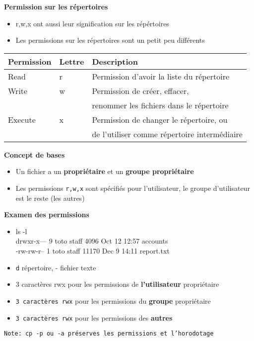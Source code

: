 \documentclass[french]{beamer}
\begin{document}
\begin{frame}
\textbf{Permission sur les répertoires}
    \begin{itemize}
    \item r,w,x ont aussi leur signification sur les répértoires
    \item Les permissions sur les répertoires sont un petit peu différents
\end{itemize}
\begin{tabular}{|l|l|l|}
    \hline
    \textbf{Permission} & \textbf{Lettre} & \textbf{Description} \\
    \hline
    Read & r & Permission d'avoir la liste du répertoire \\
    Write & w & Permission de créer, effacer,\\ 
    & & renommer les fichiers dans le répertoire \\
    Execute & x & Permission de changer le répertoire, ou  \\
    & & de l'utiliser comme répertoire intermédiaire \\
    \hline
\end{tabular}
\end{frame}

\begin{frame}
\textbf{Concept de bases}
\begin{itemize}
\item Un fichier a un \textbf{propriétaire} et un \textbf{groupe propriétaire}
\item Les permissions \texttt{r,w,x} sont spécifiés pour l'utilisateur, le
groupe d'utilisateur est le reste (les autres)
\end{itemize}
\end{frame}

\begin{frame}
\textbf{Examen des permissions}
\begin{itemize}
\item ls -l \\
drwxr-x--- 9 toto staff  4096 Oct 12 12:57 accounts \\
-rw-rw-r-- 1 toto staff 11170 Dec 9 14:11 report.txt
\item \texttt{d} répertoire, {-} fichier texte
\item 3 caractères rwx pour les permissions de \textbf{l'utilisateur}
propriétaire
\item \texttt{3 caractères rwx} pour les permissions du \textbf{groupe}
propriétaire
\item \texttt{3 caractères rwx} pour les permissions des \textbf{autres}
\end{itemize}
\texttt{Note: cp -p ou -a préserves les permissions et l'horodotage}
\end{frame}
\end{document}
